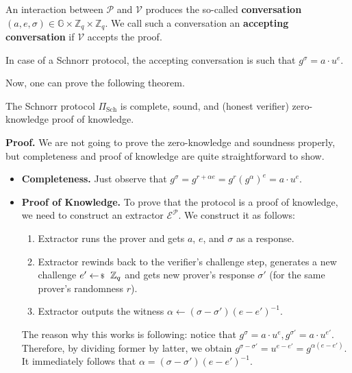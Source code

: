 \documentclass[../../book.tex]{subfiles}
\begin{document}
\begin{definition}
    An interaction between $\mathcal{P}$ and $\mathcal{V}$ produces the so-called \textbf{conversation} $(a,e,\sigma) \in \mathbb{G} \times \mathbb{Z}_q \times \mathbb{Z}_q$. We call such a conversation an \textbf{accepting conversation} if $\mathcal{V}$ accepts the proof.
\end{definition}

\begin{example}
    In case of a Schnorr protocol, the accepting conversation is such that $g^{\sigma} = a \cdot u^e$.
\end{example}

Now, one can prove the following theorem.
\begin{theorem}
    The Schnorr protocol $\Pi_{\text{Sch}}$ is complete, sound, and (honest verifier) zero-knowledge proof of knowledge.
\end{theorem}

\textbf{Proof.} We are not going to prove the zero-knowledge and soundness properly, but completeness and proof of knowledge are quite straightforward to show.

\begin{itemize}
    \item \textbf{Completeness.} Just observe that $g^{\sigma} = g^{r+\alpha e} = g^r(g^{\alpha})^e = a \cdot u^e$.
    \item \textbf{Proof of Knowledge.} To prove that the protocol is a proof of knowledge, we need to construct an extractor $\mathcal{E}^{\mathcal{P}}$. We construct it as follows:
    \begin{enumerate}
        \item Extractor runs the prover and gets $a$, $e$, and $\sigma$ as a response.
        \item Extractor rewinds back to the verifier's challenge step, generates a new challenge $e' \leftarrowS \mathbb{Z}_q$ and gets new prover's response $\sigma'$ (for the same prover's randomness $r$).
        \item Extractor outputs the witness $\alpha \gets (\sigma - \sigma')(e - e')^{-1}$.
    \end{enumerate}
    The reason why this works is following: notice that $g^{\sigma} = a \cdot u^{e}, g^{\sigma'} = a \cdot u^{e'}$. Therefore, by dividing former by latter, we obtain $g^{\sigma - \sigma'} = u^{e - e'} = g^{\alpha(e-e')}$. It immediately follows that $\alpha = (\sigma - \sigma')(e - e')^{-1}$.
\end{itemize}
\end{document}
